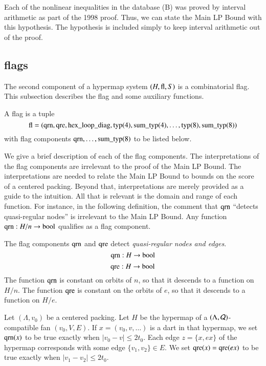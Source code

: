 \begin{remark}  Each of the nonlinear inequalities in the database
(B) was proved by interval arithmetic as part of the 1998 proof.
Thus, we can state the Main LP Bound with this hypothesis.  The
hypothesis is included simply to keep interval arithmetic out of
the proof.
\end{remark}

\subsection{flags}
\label{sec:flag}

The second component of a  hypermap system $(H,{\operatorname{fl}},S)$ is a
combinatorial flag.  This subsection describes the flag and some
auxiliary functions.

\begin{definition}[flag]
 A flag is a tuple
    $$
    {\operatorname{fl}}=({\operatorname{qrn}},{\operatorname{qre}},{\operatorname{hex\_loop\_diag}},
    {\operatorname{typ}}(4),{\operatorname{sum\_typ}}(4),\ldots,
    {\operatorname{typ}}(8),{\operatorname{sum\_typ}}(8))
    $$
 with flag components ${\operatorname{qrn}},\ldots,{\operatorname{sum\_typ}}(8)$ to be listed below.
 \end{definition}

We give a brief description of each of the flag components.  The
interpretations of the flag components are irrelevant to the proof
of the Main LP Bound.  The interpretations are needed to relate the Main LP Bound to bounds on the score of a centered packing.  Beyond that, 
interpretations are merely provided as a
guide to the intuition.  All that is relevant is the domain and
range of each function.  For instance, in the following
definition, the comment that ${\operatorname{qrn}}$ ``detects quasi-regular
nodes'' is irrelevant to the Main LP Bound.  Any function ${\operatorname{qrn}}:H/n\to\operatorname{bool}$
qualifies as a flag component.

 \begin{definition}
 The flag components ${\operatorname{qrn}}$ and ${\operatorname{qre}}$ detect {\it quasi-regular
 nodes and edges}.
        $${\operatorname{qrn}}:H \to \operatorname{bool}$$
        $${\operatorname{qre}}:H \to \operatorname{bool}$$
 The function ${\operatorname{qrn}}$ is constant on orbits of $n$, so that it
 descends to a function on $H/n$.  The function ${\operatorname{qre}}$ is
 constant on the orbits of $e$, so that it descends to a function
 on $H/e$.
\end{definition}

\begin{interpretation} 
Let $(\Lambda,v_0)$ be a centered packing.  Let
$H$ be the hypermap of a $(\Lambda,{\mathcal Q})$-compatible fan $(v_0,V,E)$.  
If $x=(v_0,v,\ldots)$ is a dart in that hypermap, we
set ${\operatorname{qrn}}(x)$ to be true exactly when $|v_0-v|\le 2t_0$.  Each 
edge $z=\{x,ex\}$ of the hypermap corresponds with some edge $\{v_1,v_2\}\in E$.
We set ${\operatorname{qre}}(x) = {\operatorname{qre}}(e x)$ to be true exactly when
$|v_1-v_2|\le 2t_0$. %
\end{interpretation}

